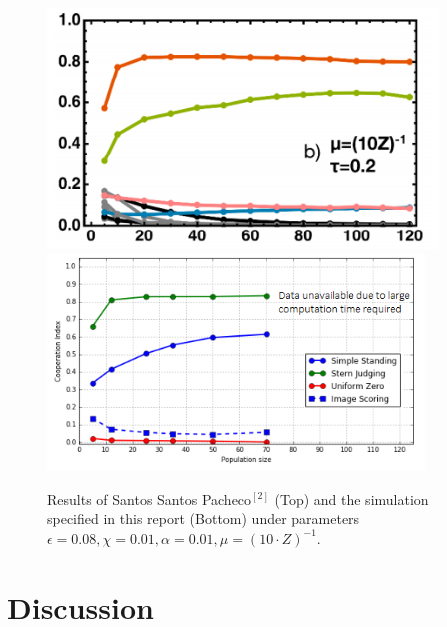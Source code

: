 \documentclass[10pt,a4paper]{article}
\begin{document}
\begin{figure}[h!]
\begin{center}
  \includegraphics[width=28em]{Images/SSP_Results.PNG}
  \includegraphics[width=27em]{Images/simulation_results_cropped.PNG}
\end{center}
  \caption{Results of Santos Santos Pacheco$^{[2]}$ (Top) and the simulation specified in this report (Bottom) under parameters $\epsilon = 0.08, \chi = 0.01, \alpha = 0.01, \mu = (10 \cdot Z)^{-1}$.}
  \label{fig:SSPresults1}
\end{figure}
\pagebreak

\section{Discussion}
\end{document}
